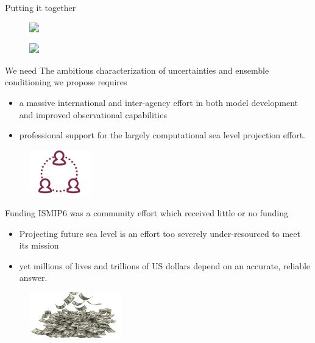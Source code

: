 \documentclass[hide notes,intlimits]{beamer}
\begin{document}
\begin{frame}{Putting it together}
    \begin{figure}
      \includegraphics<1->[height=6cm]{sle_pdf_calib}
    \end{figure}
\end{frame}


\begin{frame}
  \begin{figure}
    \includegraphics<1->[height=8cm]{sle_pdf_w_obs_2020_2100}
  \end{figure}
\end{frame}



\begin{frame}{We need}
  The ambitious characterization of uncertainties and ensemble conditioning we propose requires
  \begin{itemize}
  \item a massive international and inter-agency effort in both model development and improved observational capabilities
  \item professional support for the largely computational sea level projection effort. 
  \end{itemize}
  \begin{figure}
    \includegraphics[height=2cm]{inter-agency-cooperation}
  \end{figure}
\end{frame}

\begin{frame}{Funding}
  \alert{ISMIP6 was a community effort which received little or no funding}
  \vspace{1em}
  \begin{itemize}
  \item Projecting future sea level is an effort too severely under-resourced to meet its mission
  \item yet millions of lives and trillions of US dollars depend on an accurate, reliable answer. 
  \end{itemize}
  \begin{figure}
    \includegraphics[height=2cm]{money-falling}
  \end{figure}
\end{frame}
\end{document}
